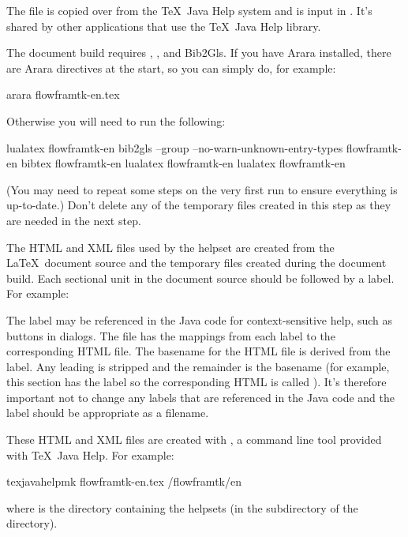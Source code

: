 The file  is copied over from the \TeX\
Java Help system and is input in .
It's shared by other applications that use the \TeX\ Java Help
library.

The document build requires \LuaLaTeX, \BibTeX, and Bib2Gls.
If you have Arara installed, there are Arara directives at the
start, so you can simply do, for example:
\begin{terminal}
arara flowframtk-en.tex
\end{terminal}
Otherwise you will need to run the following:
\begin{terminal}
lualatex flowframtk-en
bib2gls --group --no-warn-unknown-entry-types flowframtk-en
bibtex flowframtk-en
lualatex flowframtk-en
lualatex flowframtk-en
\end{terminal}
(You may need to repeat some steps on the very first run to ensure
everything is up-to-date.) Don't delete any of the temporary files
created in this step as they are needed in the next step.

The HTML and XML files used by the helpset are created from the
\LaTeX\ document source and the temporary files created during the
document build. Each sectional unit in the document source should be
followed by a label. For example:
\begin{compactcodebox}
\end{compactcodebox}
The label may be referenced in the Java code for context-sensitive
help, such as \dgls{help} buttons in dialogs. The
 file has the mappings from each label
to the corresponding HTML file. The basename for the HTML file
is derived from the label. Any leading  is stripped
and the remainder is the basename (for example, this section has the
label \code{sec:docsource} so the corresponding HTML is
called ).
It's therefore important not to change any labels that are
referenced in the Java code and the label should be appropriate 
as a filename.

These HTML and XML files are created with ,
a command line tool provided with \TeX\ Java Help. For example:
\begin{terminal}
texjavahelpmk flowframtk-en.tex /flowframtk/en
\end{terminal}
where  is the directory containing the helpsets
(in the  subdirectory of the
 directory).

